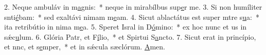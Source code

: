 2. Neque ambuláv in m\uline{a}gnis:~* neque in mirabílbus sup\uline{e}r me.
3. Si non humíliter snti\uline{é}bam:~* sed exaltávi nimam m\uline{e}am.
4. Sicut ablactátus est super mtre s\uline{u}a:~* ita retribútio in nima m\uline{e}a.
5. Speret Isral in D\uline{ó}mino:~* ex hoc nunc et us in sǽc\uline{u}lum.
6. Glória Patr, et F\uline{í}lio,~* et Spirtui S\uline{a}ncto.
7. Sicut erat in princípio, et nnc, et s\uline{e}mper,~* et in sǽcula sæclórum. \uline{A}men.
